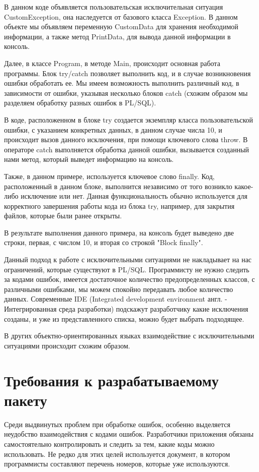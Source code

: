 В данном коде объявляется пользовательская исключительная ситуация CustomException, она наследуется от базового класса Exception. В данном объекте мы объявляем переменную CustomData для хранения необходимой информации, а также метод PrintData, для вывода данной информации в консоль. 

Далее, в классе Program, в методе Main, происходит основная работа программы. Блок try/catch позволяет выполнить код, и в случае возникновения ошибки обработать ее. Мы имеем возможность выполнить различный код, в зависимости от ошибки, указывая несколько блоков catch (схожим образом мы разделяем обработку разных ошибок в PL/SQL).

В коде, расположенном в блоке try создается экземпляр класса пользовательской ошибки, с указанием конкретных данных, в данном случае числа 10, и происходит вызов данного исключения, при помощи ключевого слова throw. В операторе catch выполняется обработка данной ошибки, вызывается созданный нами метод, который выведет информацию на консоль. 

Также, в данном примере, используется ключевое слово finally. Код, расположенный в данном блоке, выполнится независимо от того возникло какое-либо исключение или нет. Данная функциональность обычно используется для корректного завершения работы кода из блока try, например, для закрытия файлов, которые были ранее открыты.

В результате выполнения данного примера, на консоль будет выведено две строки, первая, с числом 10, и вторая со строкой "Block finally".

Данный подход к работе с исключительными ситуациями не накладывает на нас ограничений, которые существуют в PL/SQL. Программисту не нужно следить за кодами ошибок, имеется достаточное количество предопределенных классов, с различными ошибками, мы можем спокойно передавать любое количество данных. Современные IDE (Integrated development environment англ. - Интегрированная среда разработки) подскажут разработчику какие исключения созданы, и уже из представленного списка, можно будет выбрать подходящее.

В других объектно-ориентированных языках взаимодействие с исключительными ситуациями происходит схожим образом. 


\section{Требования к разрабатываемому пакету}\label{ch2:sec5}

Среди выдвинутых проблем при обработке ошибок, особенно выделяется неудобство взаимодействия с кодами ошибок. Разработчики приложения обязаны самостоятельно контролировать и следить за тем, какие коды можно использовать. Не редко для этих целей используется документ, в котором программисты составляют перечень номеров, которые уже используются. 

